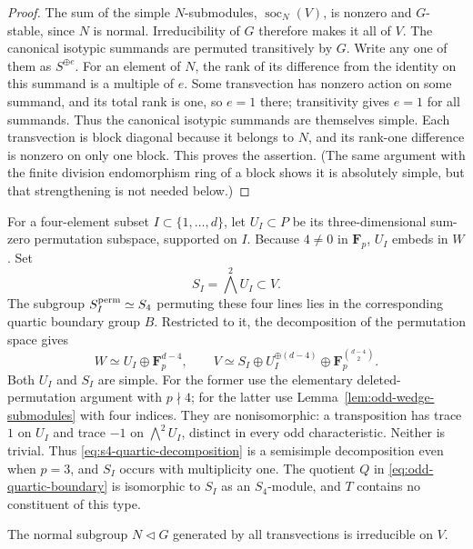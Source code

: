 \begin{proof}
The sum of the simple $N$-submodules, $\operatorname{soc}_N(V)$, is
nonzero and $G$-stable, since $N$ is normal.  Irreducibility of $G$
therefore makes it all of $V$.  The canonical isotypic summands are
permuted transitively by $G$.  Write any one of them as $S^{\oplus e}$.
For an element of $N$, the rank of its difference from the identity
on this summand is a multiple of $e$.  Some transvection has nonzero
action on some summand, and its total rank is one, so $e=1$ there;
transitivity gives $e=1$ for all summands.  Thus the canonical
isotypic summands are themselves simple.  Each transvection is
block diagonal because it belongs to $N$, and its rank-one
difference is nonzero on only one block.  This proves the assertion.
(The same argument with the finite division endomorphism ring of a
block shows it is absolutely simple, but that strengthening is not
needed below.)
\end{proof}

For a four-element subset $I\subset\{1,\ldots,d\}$, let
$U_I\subset P$ be its three-dimensional sum-zero permutation
subspace, supported on $I$.  Because $4\ne0$ in $\mathbf F_p$,
$U_I$ embeds in $W$.  Set
\[
 S_I=\bigwedge^2 U_I\subset V.
\]
The subgroup $S_I^{\rm perm}\simeq S_4$ permuting these four lines
lies in the corresponding quartic boundary group $B$.  Restricted
to it, the decomposition of the permutation space gives
\begin{equation}\label{eq:s4-quartic-decomposition}
 W\simeq U_I\oplus\mathbf F_p^{d-4},\qquad
 V\simeq S_I\oplus U_I^{\oplus(d-4)}
             \oplus\mathbf F_p^{\binom{d-4}{2}}.
\end{equation}
Both $U_I$ and $S_I$ are simple.  For the former use the elementary
deleted-permutation argument with $p\nmid4$; for the latter use
Lemma~\ref{lem:odd-wedge-submodules} with four indices.  They are
nonisomorphic: a transposition has trace $1$ on $U_I$ and trace $-1$
on $\bigwedge^2U_I$, distinct in every odd characteristic.  Neither
is trivial.  Thus \eqref{eq:s4-quartic-decomposition} is a semisimple
decomposition even when $p=3$, and $S_I$ occurs with multiplicity one.
The quotient $Q$ in \eqref{eq:odd-quartic-boundary} is isomorphic to
$S_I$ as an $S_4$-module, and $T$ contains no constituent of this type.

\begin{proposition}\label{prop:odd-transvection-normal-irreducible}
The normal subgroup $N\triangleleft G$ generated by all transvections
is irreducible on $V$.
\end{proposition}

